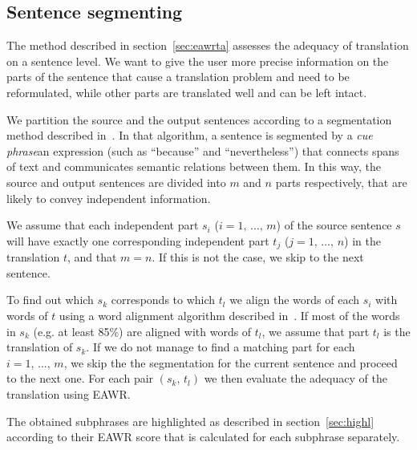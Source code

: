 \documentclass[hidelinks,10pt,letter]{article} %
\begin{document}
    \subsection{Sentence segmenting}\label{sec:segment}
    The method described in section~\ref{sec:eawrta} assesses the adequacy
    of translation on a sentence level. We want to give the user more 
    precise information on the parts of the sentence that cause a translation
    problem and need to be reformulated, while other parts are translated
    well and can be left intact. 
    
    We partition the source and the output sentences according to a segmentation method described
    in~\cite{marcu1997rhetorical}. In that algorithm, a sentence is
    segmented by a \textit{cue phrase}\dash an expression (such as ``because'' and ``nevertheless'') that connects spans of text and 
    communicates semantic relations between them. In this way, the source and output sentences are divided
    into $m$ and $n$ parts respectively, that are likely to convey independent information.
    
    We assume that each independent part $s_i$ ($i=1,\,\dots,\,m$) of the source sentence $s$ will have exactly
    one corresponding independent part $t_j$ ($j=1,\,\dots,\,n$)
    in the translation $t$, and that $m=n$. If this is not the case, we skip to the next sentence.
    
    To find out which  $s_k$ corresponds to which  $t_l$ we align the words of each $s_i$ with words of $t$
    using a word alignment algorithm described in~\cite{simard2003statistical}.
    If most of the words in $s_k$ (e.g. at least 85\%) are aligned with words of $t_l$, we assume that part $t_l$ is
    the translation of $s_k$. If we do not manage to find a matching part for each $i=1,\,\dots,\,m$, we skip
    the the segmentation for the current sentence and proceed to the next one. For each pair $(s_k,\,t_l)$ we then evaluate the adequacy of the translation
    using EAWR.
    
    The obtained subphrases are highlighted as described in section~\ref{sec:highl} according to their EAWR score
    that is calculated for each subphrase separately.
    
\end{document}

